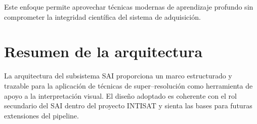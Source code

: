 Este enfoque permite aprovechar técnicas modernas de aprendizaje profundo sin
comprometer la integridad científica del sistema de adquisición.

\section{Resumen de la arquitectura}

La arquitectura del subsistema SAI proporciona un marco estructurado y trazable
para la aplicación de técnicas de super--resolución como herramienta de apoyo a
la interpretación visual. El diseño adoptado es coherente con el rol secundario
del SAI dentro del proyecto INTISAT y sienta las bases para futuras extensiones
del pipeline.
